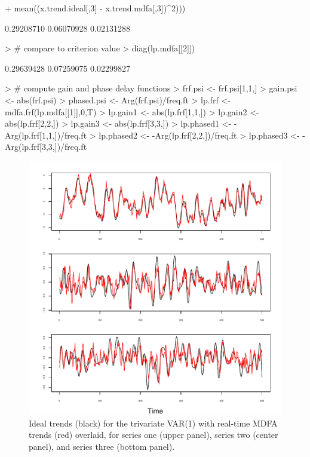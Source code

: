\documentclass[a4paper]{book}
\begin{document}
\begin{Schunk}
\begin{Sinput}
+ 	mean((x.trend.ideal[,3] - x.trend.mdfa[,3])^2)))
\end{Sinput}
\begin{Soutput}
[1] 0.29208710 0.06070928 0.02131288
\end{Soutput}
\begin{Sinput}
> # compare to criterion value
> diag(lp.mdfa[[2]])
\end{Sinput}
\begin{Soutput}
[1] 0.29639428 0.07259075 0.02299827
\end{Soutput}
\begin{Sinput}
> # compute gain and phase delay functions
> frf.psi <- frf.psi[1,1,]
> gain.psi <- abs(frf.psi)
> phased.psi <- Arg(frf.psi)/freq.ft
> lp.frf <- mdfa.frf(lp.mdfa[[1]],0,T)
> lp.gain1 <- abs(lp.frf[1,1,])
> lp.gain2 <- abs(lp.frf[2,2,])
> lp.gain3 <- abs(lp.frf[3,3,])
> lp.phased1 <- -Arg(lp.frf[1,1,])/freq.ft
> lp.phased2 <- -Arg(lp.frf[2,2,])/freq.ft
> lp.phased3 <- -Arg(lp.frf[3,3,])/freq.ft
\end{Sinput}
\end{Schunk}



\begin{figure}[htb!]
\begin{center}
\includegraphics[]{"mdfa_trivar1_filtering.pdf"}
\caption{Ideal trends (black) for the trivariate VAR(1)
	with real-time MDFA trends (red) overlaid, for series one (upper panel),
	series two (center panel), and series three (bottom panel). }
\label{fig:trivar1.trends}
\end{center}
\end{figure}
\end{document}
